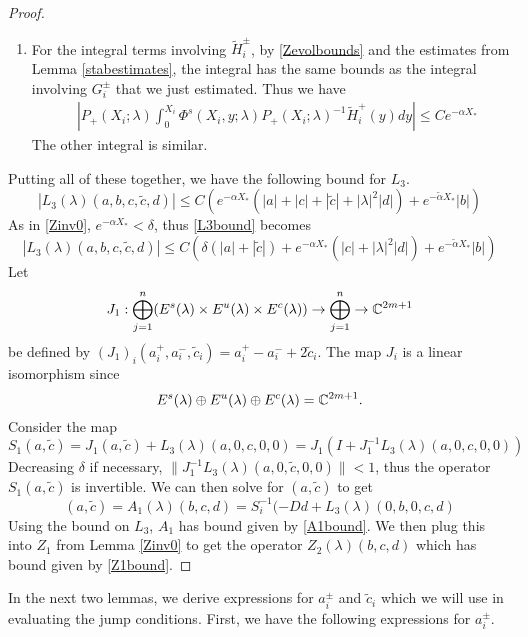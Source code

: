 \documentclass[thesis.tex]{subfiles}
\begin{document}
\begin{lemma}
\begin{proof}
\begin{enumerate}
\item For the integral terms involving $\tilde{H}_i^\pm$, by \eqref{Zevolbounds} and the estimates from Lemma \ref{stabestimates}, the integral has the same bounds as the integral involving $G_i^\pm$ that we just estimated. Thus we have
\begin{align*}
&\left|
P_+(X_i; \lambda) \int_0^{X_i} \Phi^s(X_i, y; \lambda) P_+(X_i; \lambda)^{-1} \tilde{H}_i^+(y) dy \right| \leq C e^{-\alpha X_*} 
\end{align*}
The other integral is similar.
\end{enumerate}

Putting all of these together, we have the following bound for $L_3$.
\begin{equation}\label{L3bound}
|L_3(\lambda)(a, b, c, \tilde{c}, d)| \leq C \left( e^{-\alpha X_*} (|a| + |c| + |\tilde{c}| + |\lambda|^2 |d|) + e^{-\tilde{\alpha} X_*} |b| \right)
\end{equation}
As in \cref{Zinv0}, $e^{-\alpha X_*} < \delta$, thus \cref{L3bound} becomes
\begin{equation*}
|L_3(\lambda)(a, b, c, \tilde{c}, d)| \leq C \left( \delta (|a| + |\tilde{c}|) + e^{-\alpha X_*}(|c| + |\lambda|^2 |d|) + e^{-\tilde{\alpha} X_*} |b| \right)
\end{equation*}
Let 
\[
J_1: \bigoplus_{j=1}^n (E^s(\lambda) \times E^u(
\lambda) \times E^c(\lambda) ) \rightarrow \bigoplus_{j=1}^n \rightarrow \mathbb{C}^{2m+1}
\]
be defined by $(J_1)_i(a_i^+, a_i^-, \tilde{c}_i) = a_i^+ - a_i^- + 2 \tilde{c}_i$. The map $J_i$ is a linear isomorphism since 
\[
E^s(\lambda) \oplus E^u(\lambda) \oplus E^c(\lambda) = \mathbb{C}^{2m+1}.
\]
Consider the map
\[
S_1(a, \tilde{c}) = J_1 (a, \tilde{c}) + L_3(\lambda)(a, 0, c, 0, 0) = J_1( I + J_1^{-1} L_3(\lambda)(a, 0, c, 0, 0))
\]
Decreasing $\delta$ if necessary, $\|J_1^{-1} L_3(\lambda)(a, 0, \tilde{c}, 0, 0)\| < 1$, thus the operator $S_1(a, \tilde{c})$ is invertible. We can then solve for $(a, \tilde{c})$ to get
\[
(a, \tilde{c}) = A_1(\lambda)(b, c, d) = S_i^{-1}(-D d + L_3(\lambda)(0, b, 0, c, d)
\]
Using the bound on $L_3$, $A_1$ has bound given by \cref{A1bound}. We then plug this into $Z_1$ from Lemma \ref{Zinv0} to get the operator $Z_2(\lambda)(b,c,d)$ which has bound given by \cref{Z1bound}.
\end{proof}
\end{lemma}

In the next two lemmas, we derive expressions for $a_i^\pm$ and $\tilde{c}_i$ which we will use in evaluating the jump conditions. First, we have the following expressions for $a_i^\pm$.
\end{document}
